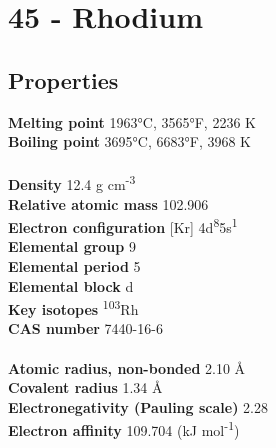\section{45 - Rhodium}
\label{sec:elem-rhodium}
\subsection{Properties}
\textbf{Melting point} 1963°C, 3565°F, 2236 K\\
\textbf{Boiling point} 3695°C, 6683°F, 3968 K\\
\\
\textbf{Density} 12.4 g cm\textsuperscript{-3}\\
\textbf{Relative atomic mass} 102.906\\
\textbf{Electron configuration} [Kr] 4d\textsuperscript{8}5s\textsuperscript{1}\\
\textbf{Elemental group} 9\\
\textbf{Elemental period} 5\\
\textbf{Elemental block} d\\
\textbf{Key isotopes} \textsuperscript{103}Rh\\
\textbf{CAS number} 7440-16-6\\
\\
\textbf{Atomic radius, non-bonded} 2.10 Å\\
\textbf{Covalent radius} 1.34 Å\\
\textbf{Electronegativity (Pauling scale)} 2.28\\
\textbf{Electron affinity} 109.704 (kJ mol\textsuperscript{-1})\\